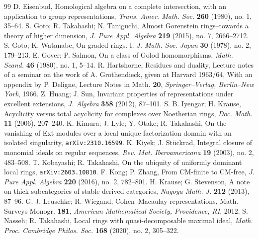 \documentclass{amsart}
\theoremstyle{definition}
\theoremstyle{remark}
\numberwithin{equation}{thm}
\begin{document}
\begin{thebibliography}{99}
{\sc D. Eisenbud}, Homological algebra on a complete intersection, with an application to group representations, {\it Trans. Amer. Math. Soc.} {\bf 260} (1980), no. 1, 35--64.
{\sc S. Goto; R. Takahashi; N. Taniguchi}, Almost Gorenstein rings--towards a theory of higher dimension, {\it J. Pure Appl. Algebra} {\bf 219} (2015), no. 7, 2666--2712.
{\sc S. Goto; K. Watanabe}, On graded rings. I. {\it J. Math. Soc. Japan} {\bf 30} (1978), no. 2, 179--213.
{\sc E. Gover; P. Salmon},  On a class of Golod homomorphisms, {\em Math. Scand.} {\bf 46} (1980), no. 1, 5--14.
{\sc R. Hartshorne}, Residues and duality, Lecture notes of a seminar on the work of A. Grothendieck, given at Harvard 1963/64, With an appendix by P. Deligne, Lecture Notes in Math. {\bf 20}, {\em Springer--Verlag, Berlin--New York}, 1966.
{\sc Z. Huang; J. Sun}, Invariant properties of representations under excellent extensions, {\em J. Algebra} {\bf 358} (2012), 87--101.
{\sc S. B. Iyengar; H. Krause}, Acyclicity versus total acyclicity for complexes over Noetherian rings, {\it Doc. Math.} {\bf 11} (2006), 207--240.
{\sc K. Kimura; J. Lyle; Y. Otake; R. Takahashi}, On the vanishing of Ext modules over a local unique factorization domain with an isolated singularity, {\tt arXiv:2310.16599}.
{\sc K. Kiyek; J. St\"{u}ckrad}, Integral closure of monomial ideals on regular sequences, {\em Rev. Mat. Iberoamericana} {\bf 19} (2003), no. 2, 483--508.
{\sc T. Kobayashi; R. Takahashi}, On the ubiquity of uniformly dominant local rings, {\tt arXiv:2603.10810}.
{\sc F. Kong; P. Zhang}, From CM-finite to CM-free, {\em J. Pure Appl. Algebra} {\bf 220} (2016), no. 2, 782--801.
{\sc H. Krause; G. Stevenson}, A note on thick subcategories of stable derived categories, {\em Nagoya Math. J.} {\bf 212} (2013), 87--96.
{\sc G. J. Leuschke; R. Wiegand}, Cohen--Macaulay representations, Math. Surveys Monogr. {\bf 181}, {\em American Mathematical Society, Providence, RI}, 2012.
{\sc S. Nasseh; R. Takahashi}, Local rings with quasi-decomposable maximal ideal, {\em Math. Proc. Cambridge Philos. Soc.} {\bf 168} (2020), no. 2, 305--322.

\end{thebibliography}
\end{document}
